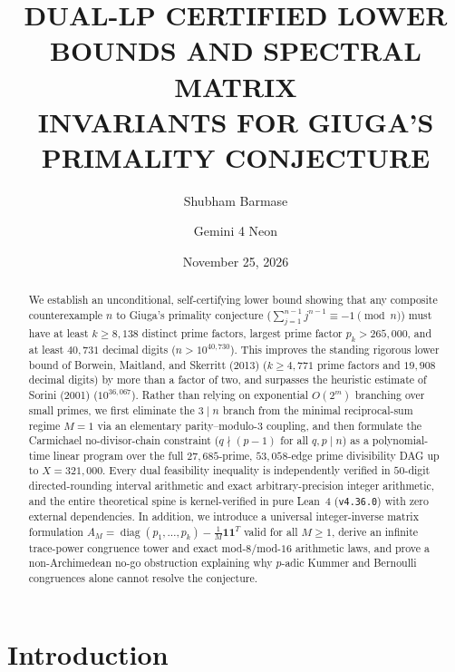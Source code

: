 \documentclass[11pt]{amsart}
\title[Dual-LP Certified Lower Bounds for Giuga's Conjecture]{%
    DUAL-LP CERTIFIED LOWER BOUNDS AND SPECTRAL MATRIX\\
    INVARIANTS FOR GIUGA'S PRIMALITY CONJECTURE}
\author{Shubham Barmase}
\author{Gemini 4 Neon}
\date{November 25, 2026}
\theoremstyle{definition}
\theoremstyle{remark}
\numberwithin{equation}{section}
\begin{document}
\begin{abstract}
We establish an unconditional, self-certifying lower bound showing that any composite counterexample $n$ to Giuga's primality conjecture ($\sum_{j=1}^{n-1} j^{n-1} \equiv -1 \pmod n$) must have at least $k \ge 8{,}138$ distinct prime factors, largest prime factor $p_k > 265{,}000$, and at least $40{,}731$ decimal digits ($n > 10^{40{,}730}$). This improves the standing rigorous lower bound of Borwein, Maitland, and Skerritt (2013) ($k \ge 4{,}771$ prime factors and $19{,}908$ decimal digits) by more than a factor of two, and surpasses the heuristic estimate of Sorini (2001) ($10^{36{,}067}$). Rather than relying on exponential $O(2^m)$ branching over small primes, we first eliminate the $3 \mid n$ branch from the minimal reciprocal-sum regime $M = 1$ via an elementary parity--modulo-$3$ coupling, and then formulate the Carmichael no-divisor-chain constraint ($q \nmid (p - 1)$ for all $q, p \mid n$) as a polynomial-time linear program over the full $27{,}685$-prime, $53{,}058$-edge prime divisibility DAG up to $X = 321{,}000$. Every dual feasibility inequality is independently verified in $50$-digit directed-rounding interval arithmetic and exact arbitrary-precision integer arithmetic, and the entire theoretical spine is kernel-verified in pure Lean~4 (\texttt{v4.36.0}) with zero external dependencies. In addition, we introduce a universal integer-inverse matrix formulation $A_M = \operatorname{diag}(p_1,\dots,p_k) - \frac{1}{M}\mathbf{1}\mathbf{1}^T$ valid for all $M \ge 1$, derive an infinite trace-power congruence tower and exact mod-$8$/mod-$16$ arithmetic laws, and prove a non-Archimedean no-go obstruction explaining why $p$-adic Kummer and Bernoulli congruences alone cannot resolve the conjecture.
\end{abstract}

\setcounter{tocdepth}{1}
\maketitle

{\setlength{\parskip}{1pt}\tableofcontents}
\vspace{0.8em}

\section{Introduction}
\end{document}
